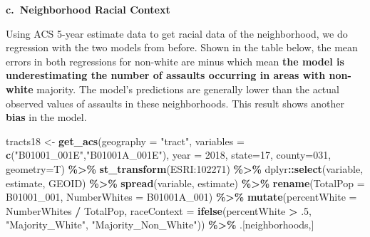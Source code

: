 \documentclass[
]{article}
\newenvironment{Shaded}{\begin{snugshade}}{\end{snugshade}}
\newcommand{\AttributeTok}[1]{\textcolor[rgb]{0.13,0.29,0.53}{#1}}
\newcommand{\DecValTok}[1]{\textcolor[rgb]{0.00,0.00,0.81}{#1}}
\newcommand{\FunctionTok}[1]{\textcolor[rgb]{0.13,0.29,0.53}{\textbf{#1}}}
\newcommand{\NormalTok}[1]{#1}
\newcommand{\OtherTok}[1]{\textcolor[rgb]{0.56,0.35,0.01}{#1}}
\newcommand{\SpecialCharTok}[1]{\textcolor[rgb]{0.81,0.36,0.00}{\textbf{#1}}}
\newcommand{\StringTok}[1]{\textcolor[rgb]{0.31,0.60,0.02}{#1}}
\begin{document}
\textbf{c.~Neighborhood Racial Context}

Using ACS 5-year estimate data to get racial data of the neighborhood,
we do regression with the two models from before. Shown in the table
below, the mean errors in both regressions for non-white are minus which
mean \textbf{the model is underestimating the number of assaults
occurring in areas with non-white} majority. The model's predictions are
generally lower than the actual observed values of assaults in these
neighborhoods. This result shows another \textbf{bias} in the model.

\begin{Shaded}
\begin{Highlighting}[]
\NormalTok{tracts18 }\OtherTok{\textless{}{-}} 
  \FunctionTok{get\_acs}\NormalTok{(}\AttributeTok{geography =} \StringTok{"tract"}\NormalTok{, }\AttributeTok{variables =} \FunctionTok{c}\NormalTok{(}\StringTok{"B01001\_001E"}\NormalTok{,}\StringTok{"B01001A\_001E"}\NormalTok{), }
          \AttributeTok{year =} \DecValTok{2018}\NormalTok{, }\AttributeTok{state=}\DecValTok{17}\NormalTok{, }\AttributeTok{county=}\DecValTok{031}\NormalTok{, }\AttributeTok{geometry=}\NormalTok{T) }\SpecialCharTok{\%\textgreater{}\%}
  \FunctionTok{st\_transform}\NormalTok{(}\StringTok{\textquotesingle{}ESRI:102271\textquotesingle{}}\NormalTok{)  }\SpecialCharTok{\%\textgreater{}\%} 
\NormalTok{  dplyr}\SpecialCharTok{::}\FunctionTok{select}\NormalTok{(variable, estimate, GEOID) }\SpecialCharTok{\%\textgreater{}\%}
  \FunctionTok{spread}\NormalTok{(variable, estimate) }\SpecialCharTok{\%\textgreater{}\%}
  \FunctionTok{rename}\NormalTok{(}\AttributeTok{TotalPop =}\NormalTok{ B01001\_001,}
         \AttributeTok{NumberWhites =}\NormalTok{ B01001A\_001) }\SpecialCharTok{\%\textgreater{}\%}
  \FunctionTok{mutate}\NormalTok{(}\AttributeTok{percentWhite =}\NormalTok{ NumberWhites }\SpecialCharTok{/}\NormalTok{ TotalPop,}
         \AttributeTok{raceContext =} \FunctionTok{ifelse}\NormalTok{(percentWhite }\SpecialCharTok{\textgreater{}}\NormalTok{ .}\DecValTok{5}\NormalTok{, }\StringTok{"Majority\_White"}\NormalTok{, }\StringTok{"Majority\_Non\_White"}\NormalTok{)) }\SpecialCharTok{\%\textgreater{}\%}
\NormalTok{  .[neighborhoods,]}


\end{Highlighting}
\end{Shaded}
\end{document}
